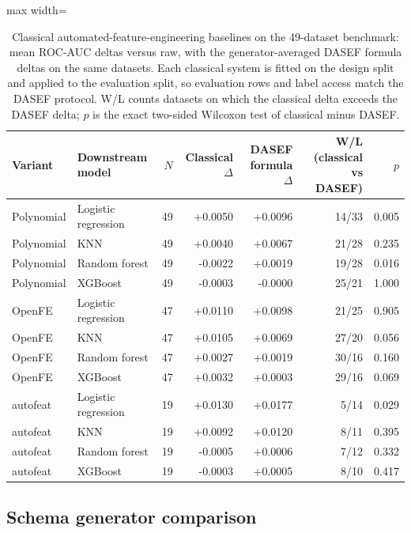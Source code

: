 \begin{table}[tbp]
\caption{Classical automated-feature-engineering baselines on the 49-dataset benchmark: mean ROC-AUC deltas versus raw, with the generator-averaged DASEF formula deltas on the same datasets. Each classical system is fitted on the design split and applied to the evaluation split, so evaluation rows and label access match the DASEF protocol. W/L counts datasets on which the classical delta exceeds the DASEF delta; $p$ is the exact two-sided Wilcoxon test of classical minus DASEF.}\label{tab:classical}
\centering
\small
\begin{adjustbox}{max width=\linewidth}
\begin{tabular}{llrrrrr}
\toprule
Variant & Downstream model & \(N\) & Classical \(\Delta\) & DASEF formula \(\Delta\) & W/L (classical vs DASEF) & \(p\) \\
\midrule
Polynomial & Logistic regression & 49 & +0.0050 & +0.0096 & 14/33 & 0.005 \\
Polynomial & KNN & 49 & +0.0040 & +0.0067 & 21/28 & 0.235 \\
Polynomial & Random forest & 49 & -0.0022 & +0.0019 & 19/28 & 0.016 \\
Polynomial & XGBoost & 49 & -0.0003 & -0.0000 & 25/21 & 1.000 \\
\midrule
OpenFE & Logistic regression & 47 & +0.0110 & +0.0098 & 21/25 & 0.905 \\
OpenFE & KNN & 47 & +0.0105 & +0.0069 & 27/20 & 0.056 \\
OpenFE & Random forest & 47 & +0.0027 & +0.0019 & 30/16 & 0.160 \\
OpenFE & XGBoost & 47 & +0.0032 & +0.0003 & 29/16 & 0.069 \\
\midrule
autofeat & Logistic regression & 19 & +0.0130 & +0.0177 & 5/14 & 0.029 \\
autofeat & KNN & 19 & +0.0092 & +0.0120 & 8/11 & 0.395 \\
autofeat & Random forest & 19 & -0.0005 & +0.0006 & 7/12 & 0.332 \\
autofeat & XGBoost & 19 & -0.0003 & +0.0005 & 8/10 & 0.417 \\
\bottomrule
\end{tabular}
\end{adjustbox}
\end{table}

\subsection{Schema generator comparison}\label{sec:generators}

